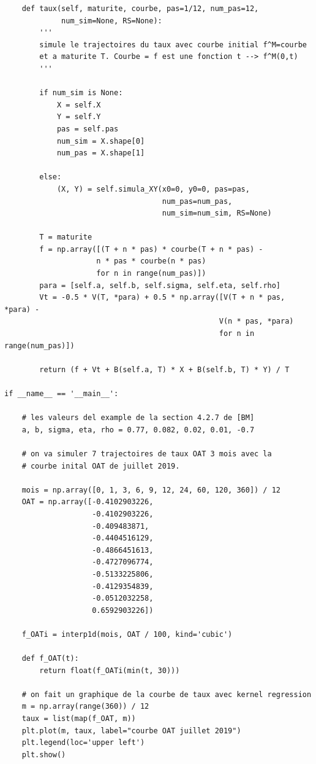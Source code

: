 \documentclass[12pt, a4paper]{book}
\begin{document}
{\begin{small}
\begin{verbatim}
    def taux(self, maturite, courbe, pas=1/12, num_pas=12,
             num_sim=None, RS=None):
        '''
        simule le trajectoires du taux avec courbe initial f^M=courbe
        et a maturite T. Courbe = f est une fonction t --> f^M(0,t)
        '''

        if num_sim is None:
            X = self.X
            Y = self.Y
            pas = self.pas
            num_sim = X.shape[0]
            num_pas = X.shape[1]

        else:
            (X, Y) = self.simula_XY(x0=0, y0=0, pas=pas,
                                    num_pas=num_pas,
                                    num_sim=num_sim, RS=None)

        T = maturite
        f = np.array([(T + n * pas) * courbe(T + n * pas) -
                     n * pas * courbe(n * pas)
                     for n in range(num_pas)])
        para = [self.a, self.b, self.sigma, self.eta, self.rho]
        Vt = -0.5 * V(T, *para) + 0.5 * np.array([V(T + n * pas, *para) -
                                                 V(n * pas, *para)
                                                 for n in range(num_pas)])

        return (f + Vt + B(self.a, T) * X + B(self.b, T) * Y) / T

if __name__ == '__main__':

    # les valeurs del example de la section 4.2.7 de [BM]
    a, b, sigma, eta, rho = 0.77, 0.082, 0.02, 0.01, -0.7

    # on va simuler 7 trajectoires de taux OAT 3 mois avec la
    # courbe inital OAT de juillet 2019.

    mois = np.array([0, 1, 3, 6, 9, 12, 24, 60, 120, 360]) / 12
    OAT = np.array([-0.4102903226,
                    -0.4102903226,
                    -0.409483871,
                    -0.4404516129,
                    -0.4866451613,
                    -0.4727096774,
                    -0.5133225806,
                    -0.4129354839,
                    -0.0512032258,
                    0.6592903226])

    f_OATi = interp1d(mois, OAT / 100, kind='cubic')

    def f_OAT(t):
        return float(f_OATi(min(t, 30)))

    # on fait un graphique de la courbe de taux avec kernel regression
    m = np.array(range(360)) / 12
    taux = list(map(f_OAT, m))
    plt.plot(m, taux, label="courbe OAT juillet 2019")
    plt.legend(loc='upper left')
    plt.show()


\end{verbatim}
\end{small}}
\end{document}
